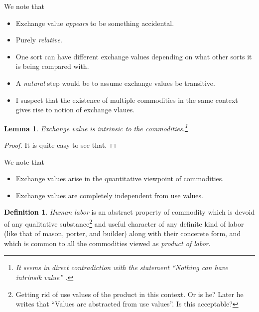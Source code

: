 \documentclass[12pt]{extarticle}
\newtheorem{lemma}[theorem]{Lemma}
\theoremstyle{definition}
\newtheorem{definition}{Definition}[section]
\newenvironment{remark}[1][Remark]{\begin{trivlist}
\item[\hskip \labelsep {\bfseries #1}]}{\end{trivlist}}
\begin{document}
  \begin{remark}
    We note that
    \begin{itemize}
    \item Exchange value \emph{appears} to be something accidental.
    \item Purely \emph{relative}.
    \item One sort can have different exchange values depending on what other sorts it is being compared with.
    \item A \emph{natural} step would be to assume exchange values be transitive.
      \item I suspect that the existence of multiple commodities in the same context gives rise to notion of exchange vlaues.
    \end{itemize}
    \end{remark}

    \begin{lemma}
      Exchange value is intrinsic to the commodities.\footnote{It seems in direct contradiction with the statement ``Nothing can have intrinsik value'' \cite{Barbon:777}.}
    \end{lemma}

    \begin{proof}
      It is quite easy to see that.
      \end{proof}

      \begin{remark}
        We note that
        \begin{itemize}
        \item Exchange values arise in the quantitative viewpoint of commodities.
          \item Exchange values are completely independent from use values.
          \end{itemize}
        \end{remark}

        \begin{definition}
          \emph{Human labor} is an abstract property of commodity which is devoid of any qualitative substance\footnote{Getting rid of use values of the product in this context.  Or is he?  Later he writes that ``Values are abstracted from use values''.  Is this acceptable?} and useful character of any definite kind of labor (like that of mason, porter, and builder) along with their concerete form, and which is common to all the commodities viewed as \emph{product of labor}.
        \end{definition}
\end{document}
